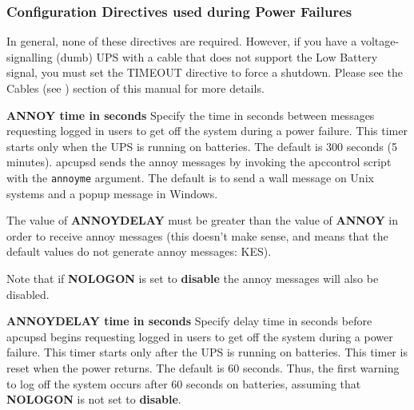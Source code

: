 {{{{{{{{{{{\label{Configuration-Directives-used-during-Power-Failures}

\subsubsection*{Configuration Directives used during Power Failures}

\label{index-Directives_002c-Power-fail-243}
\label{index-Power-fail-directives-244}
In general, none of these directives are required. However, if you have a
voltage-signalling (dumb) UPS with a cable that does not support the Low
Battery signal, you must set the TIMEOUT directive to force a shutdown. Please
see the Cables (see 
) section of this manual for more details.  

\begin{description}

\item {\bf ANNOY \lt{}time in seconds\gt{}}
Specify the time in seconds between messages requesting logged in users to get
off the system during a power failure. This timer starts only when the UPS is
running on batteries. The default is 300 seconds (5 minutes). apcupsd sends
the annoy messages by invoking the apccontrol script with the {\tt annoyme}
argument. The default is to send a wall message on Unix systems and a popup
message in Windows.  

The value of {\bf ANNOYDELAY} must be greater than the value of {\bf ANNOY} in
order to receive annoy messages (this doesn't make sense, and means that the
default values do not generate annoy messages: KES).  

Note that if {\bf NOLOGON} is set to {\bf disable} the annoy messages will
also be disabled.  

\item {\bf ANNOYDELAY \lt{}time in seconds\gt{}}
Specify delay time in seconds before apcupsd begins requesting logged in users
to get off the system during a power failure. This timer starts only after the
UPS is running on batteries. This timer is reset when the power returns. The
default is 60 seconds. Thus, the first warning to log off the system occurs
after 60 seconds on batteries, assuming that {\bf NOLOGON} is not set to {\bf
disable}.  


\end{description}}}}}}}}}}}}
